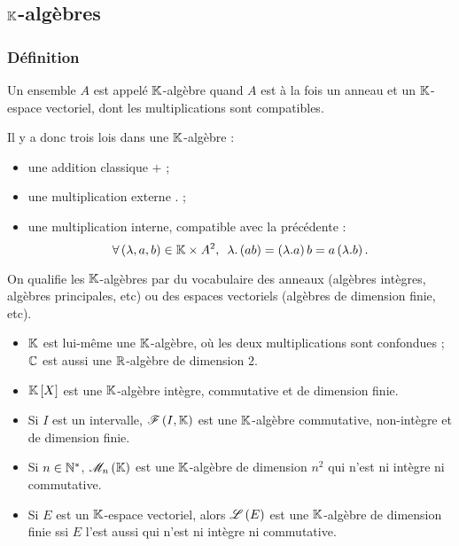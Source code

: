 \subsection{\(\mathbb{K}\)-algèbres}

\subsubsection{Définition}

\begin{defi}
Un ensemble \(A\) est appelé \(\mathbb{K}\)-algèbre quand \(A\) est à la fois un anneau et un \(\mathbb{K}\)-espace vectoriel, dont les multiplications sont compatibles.

Il y a donc trois lois dans une \(\mathbb{K}\)-algèbre :

\begin{itemize}
    \item une addition classique \(+\) ; \\
    \item une multiplication externe \(.\) ; \\
    \item une multiplication interne, compatible avec la précédente : \[\quantifs{\forall\paren{\lambda,a,b}\in\K\times A^2}\lambda.\paren{ab}=\paren{\lambda.a}b=a\paren{\lambda.b}.\]
\end{itemize}
\end{defi}

On qualifie les \(\mathbb{K}\)-algèbres par du vocabulaire des anneaux (algèbres intègres, algèbres principales, etc) ou des espaces vectoriels (algèbres de dimension finie, etc).

\begin{ex}
\begin{itemize}
    \item \(\mathbb{K}\) est lui-même une \(\mathbb{K}\)-algèbre, où les deux multiplications sont confondues ; \(\mathbb{C}\) est aussi une \(\mathbb{R}\)-algèbre de dimension \(2\). \\
    \item \(\poly\) est une \(\mathbb{K}\)-algèbre intègre, commutative et de dimension finie. \\
    \item Si \(I\) est un intervalle, \(\mathscr{F}\left(I,\mathbb{K}\right)\) est une \(\mathbb{K}\)-algèbre commutative, non-intègre et de dimension finie. \\
    \item Si \(n\in\mathbb{N}^*\), \(\M{n}\) est une \(\mathbb{K}\)-algèbre de dimension \(n^2\) qui n'est ni intègre ni commutative. \\
    \item Si \(E\) est un \(\mathbb{K}\)-espace vectoriel, alors \(\mathscr{L}\left(E\right)\) est une \(\mathbb{K}\)-algèbre de dimension finie ssi \(E\) l'est aussi qui n'est ni intègre ni commutative.
\end{itemize}
\end{ex}

